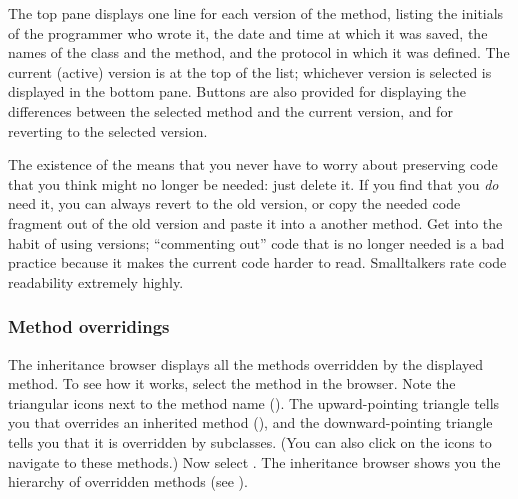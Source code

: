 \documentclass[a4paper,10pt,twoside]{book}
\begin{document}
The top pane displays one line for each version of the method, listing the initials of the programmer who wrote it, the date and time at which it was saved, the names of the class and the method, and the protocol in which it was defined.  The current (active) version is at the top of the list;  whichever version is selected is displayed in the bottom pane.
Buttons are also provided for displaying the differences between the selected method and the current version, and for reverting to the selected version.

The existence of the  means that you never have to worry about preserving code that you think might no longer be needed: just delete it.  If you find that you \emph{do} need it, you can always revert to the old version, or copy the needed code fragment out of the old version and paste it into a another method.
Get into the habit of using versions;  ``commenting out'' code that is no longer needed is a bad practice because it makes the current code harder to read.
Smalltalkers rate code readability extremely highly.


\subsubsection{Method overridings}

The inheritance browser displays all the methods overridden by the displayed method. 
To see how it works, select the  method in the browser.
Note the triangular icons next to the method name ().
The upward-pointing triangle tells you that  overrides an inherited method (\ie {}), and the downward-pointing triangle tells you that it is overridden by subclasses. (You can also click on the icons to navigate to these methods.)
Now select .
The inheritance browser shows you the hierarchy of overridden methods (see ).
\end{document}
